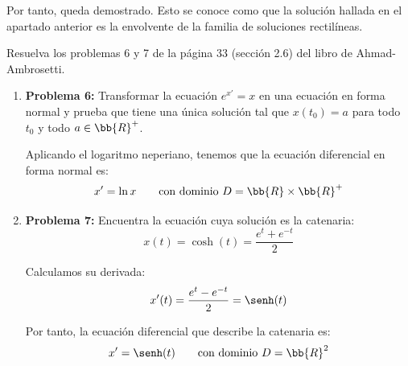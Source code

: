 \begin{ejercicio}
\begin{enumerate}
        Por tanto, queda demostrado. Esto se conoce como que la solución hallada en el apartado anterior es la envolvente de la familia de soluciones rectilíneas.
    \end{enumerate}
\end{ejercicio}

\begin{ejercicio}
    Resuelva los problemas 6 y 7 de la página 33 (sección 2.6) del libro de Ahmad-Ambrosetti.

    \begin{enumerate}
        \item \textbf{Problema 6:} Transformar la ecuación $e^{x'}=x$ en una ecuación en forma normal y prueba que tiene una única solución tal que $x(t_0)=a$ para todo $t_0$ y todo $a\in \bb{R}^+$.
        
        Aplicando el logaritmo neperiano, tenemos que la ecuación diferencial en forma normal es:
        \begin{equation*}
            x' = \ln x\qquad \text{con dominio } D=\bb{R}\times \bb{R}^+
        \end{equation*}
        
        \item \textbf{Problema 7:} Encuentra la ecuación cuya solución es la catenaria:
        \begin{equation*}
            x(t) = \cosh\left(t\right) = \dfrac{e^t + e^{-t}}{2}
        \end{equation*}

        Calculamos su derivada:
        \begin{equation*}
            x'(t) = \dfrac{e^t - e^{-t}}{2} = \senh(t)
        \end{equation*}

        Por tanto, la ecuación diferencial que describe la catenaria es:
        \begin{equation*}
            x' = \senh(t) \qquad \text{con dominio } D=\bb{R}^2
        \end{equation*}
    \end{enumerate}
\end{ejercicio}


